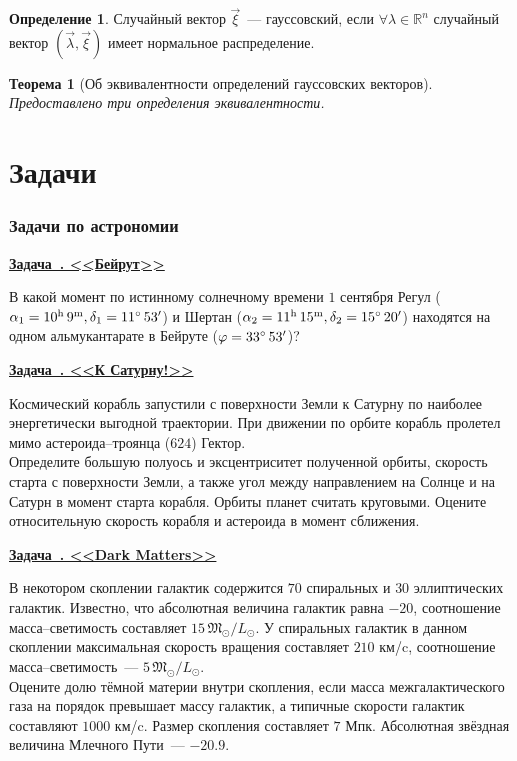 \documentclass[11pt]{article}
\newtheorem{thm}{Теорема}[section]
\theoremstyle{definition}\newtheorem{defi}{Определение}
\newcounter{taskn}[section]
\newenvironment{task}[1]{%
\begin{framed}
  \noindent
  \underline{\bfseries Задача~\stepcounter{taskn}\thetaskn. <<#1>>}
  \setlength{\parindent}{0cm}
}{%
\end{framed}
}
\begin{document}
\begin{defi}

Случайный вектор $\vec \xi$~--- гауссовский, если $\forall \lambda \in \mathbb{R}^n$ случайный вектор $(\vec \lambda, \vec \xi)$ имеет нормальное распределение.

\end{defi}

\begin{thm}[Об эквивалентности определений гауссовских векторов]

Предоставлено три определения эквивалентности.

\end{thm}


\part{Задачи}

\section{Задачи по астрономии}

\begin{task}{Бейрут}

В какой момент по истинному солнечному времени $1$ сентября Регул ($\alpha_1 = 10^\text{h} \, 9^\text{m}, \delta_1 = 11\degree \, 53'$) и Шертан ($\alpha_2 = 11^\text{h} \, 15^\text{m}, \delta_2 = 15 \degree \, 20'$) находятся на одном альмукантарате в Бейруте ($\varphi = 33 \degree \, 53'$)?

\end{task}

\begin{task}{К Сатурну!}

Космический корабль запустили с поверхности Земли к Сатурну по наиболее энергетически выгодной траектории. При движении по орбите корабль пролетел мимо астероида--троянца ($624$) Гектор.\\[10pt]
Определите большую полуось и эксцентриситет полученной орбиты, скорость старта с поверхности Земли, а также угол между направлением на Солнце и на Сатурн в момент старта корабля. Орбиты планет считать круговыми. Оцените относительную скорость корабля и астероида в момент сближения.

\end{task}

\begin{task}{Dark Matters}

В некотором скоплении галактик содержится $70$ спиральных и $30$ эллиптических галактик. Известно, что абсолютная величина галактик равна $-20$, соотношение масса--светимость составляет $15 \, \mathfrak{M}_\odot / L_\odot$. У спиральных галактик в данном скоплении максимальная скорость вращения составляет $210$ км/c, соотношение масса--светимость~--- $5 \, \mathfrak{M}_\odot / L_\odot$.\\[10pt]
Оцените долю тёмной материи внутри скопления, если масса межгалактического газа на порядок превышает массу галактик, а типичные скорости галактик составляют $1000$ км/c. Размер скопления составляет $7$ Мпк. Абсолютная звёздная величина Млечного Пути~--- $-20.9$.

\end{task}
\end{document}
